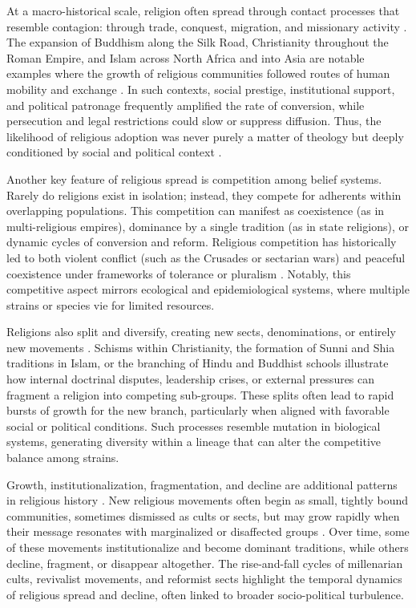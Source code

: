 \documentclass[11pt,a4paper]{article}
\begin{document}
At a macro-historical scale, religion often spread through contact processes that resemble contagion: through trade, conquest, migration, and missionary activity \cite{intro_21}. The expansion of Buddhism along the Silk Road, Christianity throughout the Roman Empire, and Islam across North Africa and into Asia are notable examples where the growth of religious communities followed routes of human mobility and exchange \cite{rw_10,rw_11}. In such contexts, social prestige, institutional support, and political patronage frequently amplified the rate of conversion, while persecution and legal restrictions could slow or suppress diffusion. Thus, the likelihood of religious adoption was never purely a matter of theology but deeply conditioned by social and political context \cite{intro_29}.

Another key feature of religious spread is competition among belief systems. Rarely do religions exist in isolation; instead, they compete for adherents within overlapping populations. This competition can manifest as coexistence (as in multi-religious empires), dominance by a single tradition (as in state religions), or dynamic cycles of conversion and reform. Religious competition has historically led to both violent conflict (such as the Crusades or sectarian wars) and peaceful coexistence under frameworks of tolerance or pluralism \cite{finke2016consequences,fox2020world,rw_14,rw_15}. Notably, this competitive aspect mirrors ecological and epidemiological systems, where multiple strains or species vie for limited resources.

Religions also split and diversify, creating new sects, denominations, or entirely new movements \cite{rw_12,rw_13}. Schisms within Christianity, the formation of Sunni and Shia traditions in Islam, or the branching of Hindu and Buddhist schools illustrate how internal doctrinal disputes, leadership crises, or external pressures can fragment a religion into competing sub-groups. These splits often lead to rapid bursts of growth for the new branch, particularly when aligned with favorable social or political conditions. Such processes resemble mutation in biological systems, generating diversity within a lineage that can alter the competitive balance among strains.

Growth, institutionalization, fragmentation, and decline are additional patterns in religious history \cite{rw_12,rw_13}. New religious movements often begin as small, tightly bound communities, sometimes dismissed as cults or sects, but may grow rapidly when their message resonates with marginalized or disaffected groups \cite{rw_16}. Over time, some of these movements institutionalize and become dominant traditions, while others decline, fragment, or disappear altogether. The rise-and-fall cycles of millenarian cults, revivalist movements, and reformist sects highlight the temporal dynamics of religious spread and decline, often linked to broader socio-political turbulence.
\end{document}
